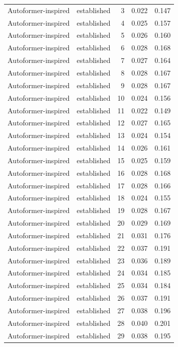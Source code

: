 \begin{tabular}{llrrr}
Autoformer-inspired & established & 3 & 0.022 & 0.147 \\
Autoformer-inspired & established & 4 & 0.025 & 0.157 \\
Autoformer-inspired & established & 5 & 0.026 & 0.160 \\
Autoformer-inspired & established & 6 & 0.028 & 0.168 \\
Autoformer-inspired & established & 7 & 0.027 & 0.164 \\
Autoformer-inspired & established & 8 & 0.028 & 0.167 \\
Autoformer-inspired & established & 9 & 0.028 & 0.167 \\
Autoformer-inspired & established & 10 & 0.024 & 0.156 \\
Autoformer-inspired & established & 11 & 0.022 & 0.149 \\
Autoformer-inspired & established & 12 & 0.027 & 0.165 \\
Autoformer-inspired & established & 13 & 0.024 & 0.154 \\
Autoformer-inspired & established & 14 & 0.026 & 0.161 \\
Autoformer-inspired & established & 15 & 0.025 & 0.159 \\
Autoformer-inspired & established & 16 & 0.028 & 0.168 \\
Autoformer-inspired & established & 17 & 0.028 & 0.166 \\
Autoformer-inspired & established & 18 & 0.024 & 0.155 \\
Autoformer-inspired & established & 19 & 0.028 & 0.167 \\
Autoformer-inspired & established & 20 & 0.029 & 0.169 \\
Autoformer-inspired & established & 21 & 0.031 & 0.176 \\
Autoformer-inspired & established & 22 & 0.037 & 0.191 \\
Autoformer-inspired & established & 23 & 0.036 & 0.189 \\
Autoformer-inspired & established & 24 & 0.034 & 0.185 \\
Autoformer-inspired & established & 25 & 0.034 & 0.184 \\
Autoformer-inspired & established & 26 & 0.037 & 0.191 \\
Autoformer-inspired & established & 27 & 0.038 & 0.196 \\
Autoformer-inspired & established & 28 & 0.040 & 0.201 \\
Autoformer-inspired & established & 29 & 0.038 & 0.195 \\

\end{tabular}
